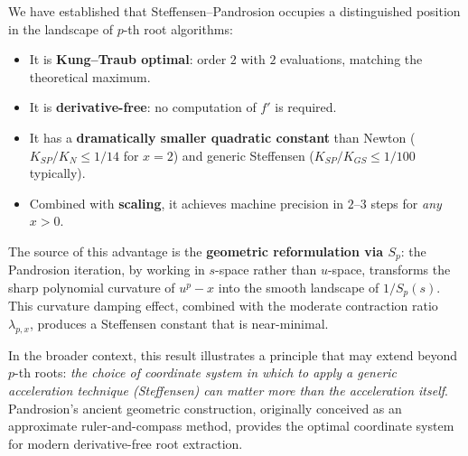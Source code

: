 \documentclass[11pt,a4paper]{article}
\theoremstyle{definition}
\begin{document}
We have established that Steffensen--Pandrosion occupies a distinguished position in the landscape of $p$-th root algorithms:

\begin{itemize}
  \item It is \textbf{Kung--Traub optimal}: order $2$ with $2$ evaluations, matching the theoretical maximum.
  \item It is \textbf{derivative-free}: no computation of $f'$ is required.
  \item It has a \textbf{dramatically smaller quadratic constant} than Newton ($K_{SP}/K_N \leq 1/14$ for $x=2$) and generic Steffensen ($K_{SP}/K_{GS} \leq 1/100$ typically).
  \item Combined with \textbf{scaling}, it achieves machine precision in $2$--$3$ steps for \emph{any} $x > 0$.
\end{itemize}

\medskip

The source of this advantage is the \textbf{geometric reformulation via $S_p$}: the Pandrosion iteration, by working in $s$-space rather than $u$-space, transforms the sharp polynomial curvature of $u^p - x$ into the smooth landscape of $1/S_p(s)$.  This curvature damping effect, combined with the moderate contraction ratio $\lambda_{p,x}$, produces a Steffensen constant that is near-minimal.

\medskip

In the broader context, this result illustrates a principle that may extend beyond $p$-th roots: \emph{the choice of coordinate system in which to apply a generic acceleration technique (Steffensen) can matter more than the acceleration itself}.  Pandrosion's ancient geometric construction, originally conceived as an approximate ruler-and-compass method, provides the optimal coordinate system for modern derivative-free root extraction.
\end{document}
